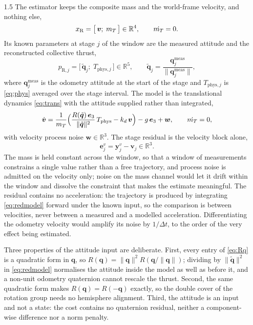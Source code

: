 \begin{spacing}{1.5}
The estimator keeps the composite mass and the world-frame velocity, and
nothing else,
\begin{equation}
x_{\mathrm R} = \bigl[\,\bm v;\; m_T\,\bigr] \in \mathbb{R}^{4},
\qquad \dot{m_T} = 0 .
\label{eq:xred}
\end{equation}
Its known parameters at stage $j$ of the window are the measured attitude and the
reconstructed collective thrust,
\begin{equation}
p_{\mathrm R,j} = \bigl[\,\tilde{\bm q}_j;\; T_{\mathrm{phys},j}\,\bigr] \in \mathbb{R}^{5},
\qquad
\tilde{\bm q}_j = \frac{\bm q^{\mathrm{meas}}_j}{\lVert \bm q^{\mathrm{meas}}_j\rVert},
\label{eq:pred}
\end{equation}
where $\bm q^{\mathrm{meas}}_j$ is the odometry attitude at the start of the
stage and $T_{\mathrm{phys},j}$ is \eqref{eq:phys} averaged over the stage interval. The
model is the translational dynamics \eqref{eq:trans} with the attitude supplied
rather than integrated,
\begin{equation}
\dot{\bm v} = \frac{1}{m_T}\Bigl( \frac{R(\tilde{\bm q})\,\bm{e}_3}{\lVert\tilde{\bm q}\rVert^{2}}\, T_{\mathrm{phys}} - k_d\,\bm v \Bigr) - g\,\bm{e}_3 + \bm w,
\qquad \dot{m_T} = 0,
\label{eq:redmodel}
\end{equation}
with velocity process noise $\bm w\in\mathbb R^{3}$. The stage residual is the
velocity block alone,
\begin{equation}
\bm e^v_j = \bm y^v_j - \bm v_j \in \mathbb{R}^{3}.
\label{eq:redresid}
\end{equation}
The mass is held constant across the window, so that a window of measurements
constrains a single value rather than a free trajectory, and process noise is
admitted on the velocity only; noise on the mass channel would let it drift
within the window and dissolve the constraint that makes the estimate
meaningful. The residual contains no acceleration: the trajectory is produced by
integrating \eqref{eq:redmodel} forward under the known input, so the
comparison is between velocities, never between a measured and a modelled
acceleration. Differentiating the odometry velocity would amplify its noise by
$1/\Delta t$, to the order of the very effect being estimated.

Three properties of the attitude input are deliberate. First, every entry of
\eqref{eq:Rq} is a quadratic form in $\bm q$, so
$R(\bm q)=\lVert\bm q\rVert^{2}R(\bm q/\lVert\bm q\rVert)$; dividing by
$\lVert\tilde{\bm q}\rVert^{2}$ in \eqref{eq:redmodel} normalises the attitude
inside the model as well as before it, and a non-unit odometry quaternion cannot
rescale the thrust. Second, the same quadratic form makes $R(\bm q)=R(-\bm q)$
exactly, so the double cover of the rotation group needs no hemisphere alignment.
Third, the attitude is an input and not a state: the cost contains no quaternion
residual, neither a component-wise difference nor a norm penalty.


\end{spacing}

